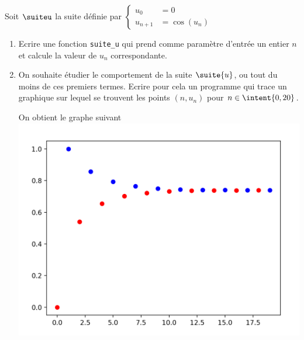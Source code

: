 \begin{probleme}[Informatique]
Soit $\suiteu$ la suite définie par $\left\{ \begin{array}{ll} 
u_0&=0\\
u_{n+1} &= \cos(u_n)
\end{array}\right.$

\begin{enumerate}
\item Ecrire une fonction \texttt{suite\_u} qui prend comme paramètre d'entrée un entier $n$ et calcule la valeur de $u_n$ correspondante. 
\item On souhaite étudier le comportement de la suite $\suite{u}$, ou tout du moins de ces premiers termes. Ecrire pour cela un programme qui trace un graphique sur lequel se trouvent les points $(n,u_n)$ pour $n\in \intent{0,20}$.

\begin{minipage}[t]{0.4 \textwidth}
On obtient le graphe suivant
\includegraphics[scale=0.3]{suiteu}


\end{minipage}
\end{enumerate}
\end{probleme}
